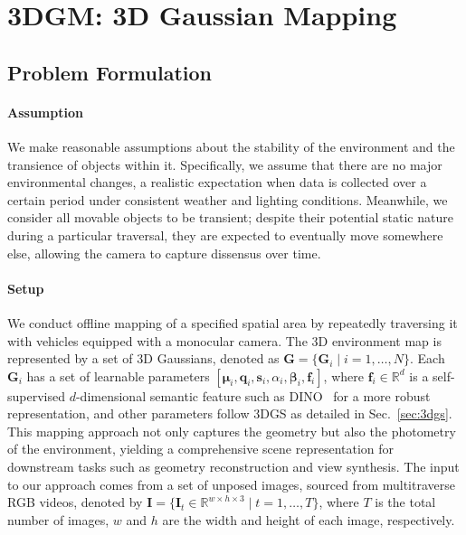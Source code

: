 \section{3DGM: 3D Gaussian Mapping}
\label{sec:gaussianmapping}
\subsection{Problem Formulation}
\paragraph{Assumption} We make reasonable assumptions about the stability of the environment and the transience of objects within it. Specifically, we assume that there are no major environmental changes, a realistic expectation when data is collected over a certain period under consistent weather and lighting conditions. Meanwhile, we consider all movable objects to be transient; despite their potential static nature during a particular traversal, they are expected to eventually move somewhere else, allowing the camera to capture dissensus over time. 
\paragraph{Setup} 
We conduct offline mapping of a specified spatial area by repeatedly traversing it with vehicles equipped with a monocular camera. The 3D environment map is represented by a set of 3D Gaussians, denoted as $\mathbf{G}=\{\mathbf{G}_i \mid i = 1, \ldots, N\}$. Each $\mathbf{G}_i$ has a set of learnable parameters $[\boldsymbol{\mu}_i, \mathbf{q}_i, \mathbf{s}_i, \alpha_i, \bm{\beta}_i, \mathbf{f}_i]$, where  \( \mathbf{f}_i \in \mathbb{R}^d \) is a self-supervised $d$-dimensional semantic feature such as DINO~\cite{oquab2023dinov2} for a more robust representation, and other parameters follow 3DGS as detailed in Sec.~\ref{sec:3dgs}. This mapping approach not only captures the geometry but also the photometry of the environment, yielding a comprehensive scene representation for downstream tasks such as geometry reconstruction and view synthesis. The input to our approach comes from a set of unposed images, sourced from multitraverse RGB videos, denoted by $\mathbf{I}=\{\mathbf{I}_t \in \mathbb{R}^{w\times h\times 3} \mid t = 1, \ldots, T\}$, where $T$ is the total number of images, $w$ and $h$ are the width and height of each image, respectively. 
